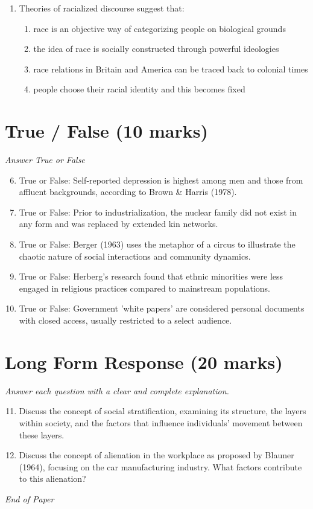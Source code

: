 \documentclass[12pt]{article}
\begin{document}
\begin{enumerate}[label=\arabic*.]
\begin{enumerate}[label=(\alph*)]
    \item non-criminal deviance
    \item global terrorism
\end{enumerate}
\item Theories of racialized discourse suggest that:
\begin{enumerate}[label=(\alph*)]
    \item race is an objective way of categorizing people on biological grounds
    \item the idea of race is socially constructed through powerful ideologies
    \item race relations in Britain and America can be traced back to colonial times
    \item people choose their racial identity and this becomes fixed
\end{enumerate}
\end{enumerate}

\section*{True / False (10 marks)}
\textit{Answer True or False}
\begin{enumerate}[label=\arabic*.]
\setcounter{enumi}{5}
\item True or False: Self-reported depression is highest among men and those from affluent backgrounds, according to Brown \& Harris (1978).
\item True or False: Prior to industrialization, the nuclear family did not exist in any form and was replaced by extended kin networks.
\item True or False: Berger (1963) uses the metaphor of a circus to illustrate the chaotic nature of social interactions and community dynamics.
\item True or False: Herberg's research found that ethnic minorities were less engaged in religious practices compared to mainstream populations.
\item True or False: Government 'white papers' are considered personal documents with closed access, usually restricted to a select audience.
\end{enumerate}

\section*{Long Form Response (20 marks)}
\textit{Answer each question with a clear and complete explanation.}
\begin{enumerate}[label=\arabic*.]
\setcounter{enumi}{10}
\item Discuss the concept of social stratification, examining its structure, the layers within society, and the factors that influence individuals' movement between these layers.
\item Discuss the concept of alienation in the workplace as proposed by Blauner (1964), focusing on the car manufacturing industry. What factors contribute to this alienation?
\end{enumerate}

\vfill
\noindent\textit{End of Paper}
\end{document}

